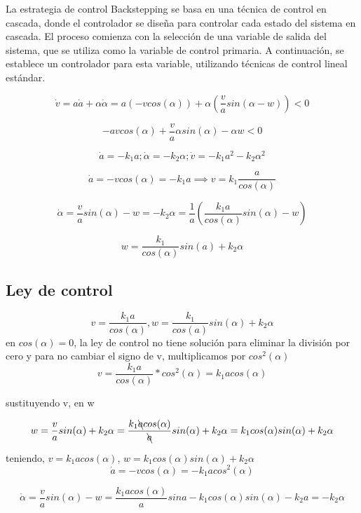 \documentclass[oneside,onecolumn]{article}
\begin{document}
La estrategia de control Backstepping se basa en una técnica de control en cascada, donde el controlador se diseña para controlar cada estado del sistema en cascada. El proceso comienza con la selección de una variable de salida del sistema, que se utiliza como la variable de control primaria. A continuación, se establece un controlador para esta variable, utilizando técnicas de control lineal estándar.

\[ \dot{v} = a\dot{a}+\alpha\dot{\alpha} = a(-vcos(\alpha))+\alpha\left(\frac{v}{a}sin(\alpha -w)\right) < 0\]

\[ -a v cos(\alpha) + \frac{v}{a} \alpha sin(\alpha) - \alpha w < 0\]

\[\dot{a} = -k_{1}a ; \dot{\alpha} = -k_{2}\alpha ; \dot{v} = -k_{1}a^{2} - k_{2}\alpha^{2} \]

\[ \dot{a} = -v cos(\alpha) = -k_{1}a \implies v = k_{1} \frac{a}{cos(\alpha)} \]

\[ \dot{\alpha} = \frac{v}{a} sin(\alpha) - w = -k_{2}\alpha = \frac{1}{a} \left( \frac{k_{1}a}{cos(\alpha)} sin(\alpha)-w\right)\]

\[ w = \frac{k_{1}}{cos(\alpha)} sin(a) + k_{2}\alpha\]

\subsection{Ley de control}

\[ v = \frac{k_{1}a}{cos(\alpha)},{  } w= \frac{k_{1}}{cos(a)}sin(\alpha)+k_{2}\alpha\]
en $cos(\alpha) = 0$, la ley de control no tiene solución para eliminar la división por cero y para no cambiar el signo de v, multiplicamos por $cos^2(\alpha)$\\

\[ v = \frac{k_{1}a}{cos(\alpha)}*cos^2(\alpha) = k_{1}a cos(\alpha)\]

sustituyendo v, en w

\[ w = \frac{v}{a} sin(\alpha) + k_{2}\alpha = \frac{k_{1}\bcancel{a} cos(\alpha)}{\bcancel{a}} sin(\alpha) + k_{2} \alpha = k_{1} cos(\alpha) sin(\alpha) + k_{2}\alpha\]

teniendo, $v=k_{1}a cos(\alpha)$, $w=k_{1}cos(\alpha) sin(\alpha)+k_{2}\alpha$\\


\[ \dot{a} = -v cos(\alpha) = -k_{1} a cos^{2}(\alpha)\]

\[ \dot{\alpha} = \frac{v}{a} sin(\alpha) - w = \frac{k_{1}a cos(\alpha)}{a} sin a - k_{1} cos(\alpha) sin(\alpha)-k_{2}a = -k_{2} \alpha \]
\end{document}
